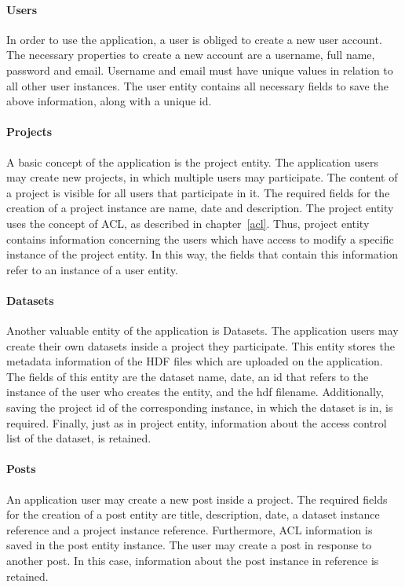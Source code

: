 	 
\paragraph{Users}
In order to use the application, a user is obliged to create a new user account. The necessary properties to create a new account are a username, full name, password and email. Username and email must have unique values in relation to all other user instances. The user entity  contains all necessary fields to save the above information, along with a unique id.
\paragraph{Projects}
A basic concept of the application is the project entity. The application users may create new projects, in which multiple users may participate. The content of a project is visible for all users that participate in it. The required fields for the creation of a project instance are name, date and description. The project entity uses the concept of ACL, as described in chapter~\ref{acl}. Thus, project entity contains information concerning the users which have access to modify a specific instance of the project entity. In this way, the fields that contain this information refer to an instance of a user entity.
\paragraph{Datasets}
Another valuable entity of the application is Datasets. The application users may create their own datasets inside a project they participate. This entity stores the metadata information of the HDF files which are uploaded on the application. The fields of this entity are the dataset name, date, an id that refers to the instance of the user who creates the entity, and the hdf filename. Additionally, saving the project id of the corresponding instance, in which the dataset is in, is required. Finally, just as in project entity, information about the access control list of the dataset, is retained.
\paragraph{Posts}
An application user may create a new post inside a project. The required fields for the creation of a post entity are title, description, date, a dataset instance reference and a project instance reference. Furthermore, ACL information  is saved in the post entity instance. The user may create a post in response to another post. In this case, information about the post instance in reference is retained.
